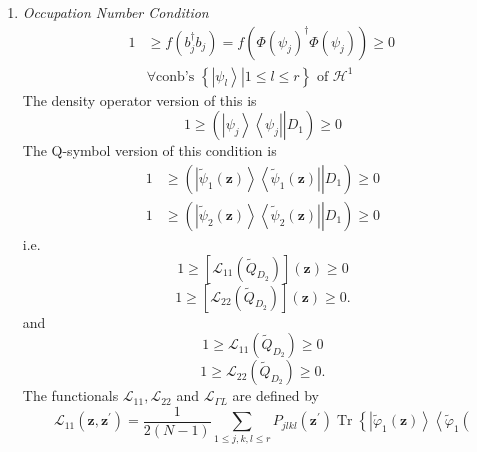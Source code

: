 \documentclass[aps,preprint]{revtex4}%
\begin{document}
\begin{enumerate}
\item \emph{Occupation Number Condition}
\begin{align}
1 &  \geq f\left(  b_{j}^{\dagger}b_{j}\right)  =f\left(  \Phi\left(  \psi
_{j}\right)  ^{\dagger}\Phi\left(  \psi_{j}\right)  \right)  \geq
0\,\nonumber\\
&  \forall\text{conb's }\left\{  \left.  \left\vert \psi_{l}\right\rangle
\right\vert 1\leq l\leq r\right\}  \text{ of }\mathcal{H}^{1}%
\end{align}
The density operator version of this is%
\begin{equation}
1\geq\left(  \left.  \left\vert \psi_{j}\right\rangle \left\langle \psi
_{j}\right\vert \right\vert D_{1}\right)  \geq0
\end{equation}
The Q-symbol version of this condition is%
\begin{align}
1 &  \geq\left(  \left.  \left\vert \tilde{\psi}_{1}\left(  \mathbf{z}\right)
\right\rangle \left\langle \tilde{\psi}_{1}\left(  \mathbf{z}\right)
\right\vert \right\vert D_{1}\right)  \geq0\nonumber\\
1 &  \geq\left(  \left.  \left\vert \tilde{\psi}_{2}\left(  \mathbf{z}\right)
\right\rangle \left\langle \tilde{\psi}_{2}\left(  \mathbf{z}\right)
\right\vert \right\vert D_{1}\right)  \geq0
\end{align}
i.e.%
\begin{equation}
1\geq\left[  \mathcal{L}_{11}\left(  \tilde{Q}_{D_{2}}\right)  \right]
\left(  \mathbf{z}\right)  \geq0
\end{equation}%
\begin{equation}
1\geq\left[  \mathcal{L}_{22}\left(  \tilde{Q}_{D_{2}}\right)  \right]
\left(  \mathbf{z}\right)  \geq0.
\end{equation}
and
\begin{equation}
1\geq\mathcal{L}_{11}\left(  \tilde{Q}_{D_{2}}\right)  \geq0
\end{equation}%
\begin{equation}
1\geq\mathcal{L}_{22}\left(  \tilde{Q}_{D_{2}}\right)  \geq0.
\end{equation}
The functionals $\mathcal{L}_{11},\mathcal{L}_{22}$ and $\mathcal{L}_{\Gamma
L}$ are defined by
\begin{equation}
\mathcal{L}_{11}\left(  \mathbf{z,z}^{\prime}\right)  =\frac{1}{2\left(
N-1\right)  }\sum_{1\leq j,k,l\leq r}P_{jlkl}\left(  \mathbf{z}^{\prime
}\right)  \operatorname*{Tr}\left\{  \left\vert \tilde{\varphi}_{1}\left(
\mathbf{z}\right)  \right\rangle \left\langle \tilde{\varphi}_{1}\left(

\end{equation}
\end{enumerate}
\end{document}

